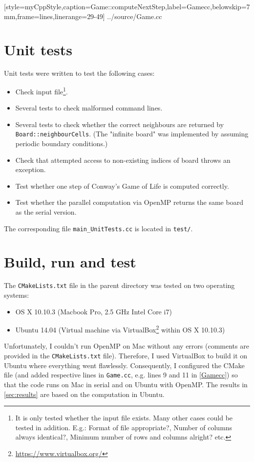 
[style=myCppStyle,caption={Game::computeNextStep},label=Gamecc,belowskip=7mm,frame=lines,linerange={29-49}]
{../source/Game.cc}

\section{Unit tests}
Unit tests were written to test the following cases:
\begin{itemize}
	\item Check input file\footnote{It is only tested whether the input file exists. Many other cases could be tested in addition. E.g.: Format of file appropriate?, Number of columns always identical?, Minimum number of rows and columns alright? etc.}.
	\item Several tests to check malformed command lines.
	\item Several tests to check whether the correct neighbours are returned by \texttt{Board::neighbourCells}. (The "infinite board" was implemented by assuming periodic boundary conditions.)
	\item Check that attempted access to non-existing indices of board throws an exception.
	\item Test whether one step of Conway's Game of Life is computed correctly.
	\item Test whether the parallel computation via OpenMP returns the same board as the serial version.
	
\end{itemize}
The corresponding file \texttt{main\_UnitTests.cc} is located in \texttt{test/}.

\section{Build, run and test}\label{sec:BuildRunTest}
The \texttt{CMakeLists.txt} file in the parent directory was tested on two operating systems:

\begin{itemize}
	\item OS X 10.10.3 (Macbook Pro, 2.5 GHz Intel Core i7)
	\item Ubuntu 14.04 (Virtual machine via VirtualBox\footnote{\url{https://www.virtualbox.org/}} within OS X 10.10.3)
\end{itemize}

Unfortunately, I couldn't run OpenMP on Mac without any errors (comments are provided in the \texttt{CMakeLists.txt} file). Therefore, I used VirtualBox to build it on Ubuntu where everything went flawlessly. Consequently, I configured the CMake file (and added respective lines in \texttt{Game.cc}, e.g. lines 9 and 11 in \cref{Gamecc}) so that the code runs on Mac in serial and on Ubuntu with OpenMP. The results in \cref{sec:results} are based on the computation in Ubuntu.


